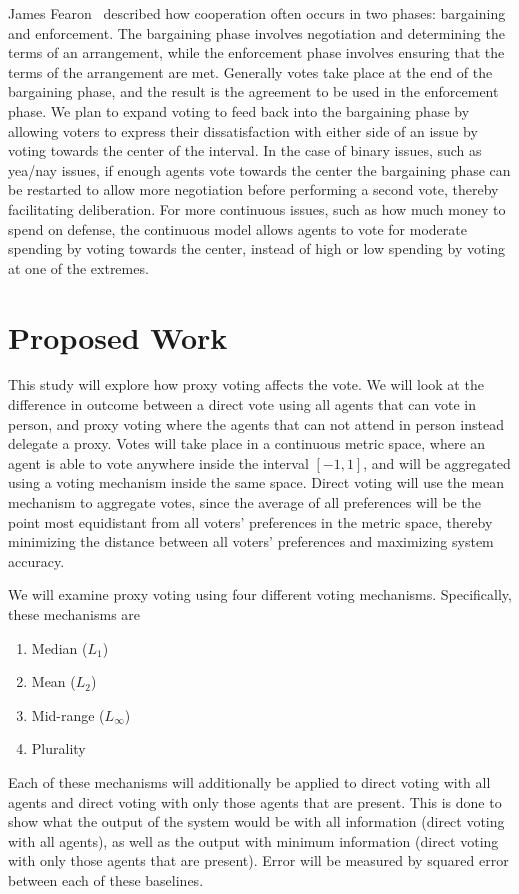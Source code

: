 James Fearon~\cite{Fearon1998} described how cooperation often occurs in two phases:
bargaining and enforcement.
The bargaining phase involves negotiation and determining the terms of an arrangement,
while the enforcement phase involves ensuring that the terms of the arrangement are met.
Generally votes take place at the end of the bargaining phase, and the result is the
agreement to be used in the enforcement phase.
We plan to expand voting to feed back into the bargaining phase by allowing voters to
express their dissatisfaction with either side of an issue by voting towards the
center of the interval.
In the case of binary issues, such as yea/nay issues, if enough agents vote towards the
center the bargaining phase can be restarted to allow more negotiation before
performing a second vote, thereby facilitating deliberation.
For more continuous issues, such as how much money to spend on defense, the
continuous model allows agents to vote for moderate spending by voting towards the
center, instead of high or low spending by voting at one of the extremes.


\section{Proposed Work}\label{sec:contribution}
This study will explore how proxy voting affects the vote.
We will look at the difference in outcome between a direct vote using all agents that
can vote in person, and proxy voting where the agents that can not attend in person
instead delegate a proxy.
Votes will take place in a continuous metric space, where an agent is able to vote
anywhere inside the interval $[-1, 1]$, and will be aggregated using a voting
mechanism inside the same space.
Direct voting will use the mean mechanism to aggregate votes, since the average of
all preferences will be the point most equidistant from all voters' preferences in
the metric space, thereby minimizing the distance between all voters' preferences and
maximizing system accuracy.

We will examine proxy voting using four different voting mechanisms.
Specifically, these mechanisms are
\begin{enumerate}
    \item Median ($L_1$)
    \item Mean ($L_2$)
    \item Mid-range ($L_\infty$)
    \item Plurality
\end{enumerate}
Each of these mechanisms will additionally be applied to direct voting with all
agents and direct voting with only those agents that are present.
This is done to show what the output of the system would be with all information
(direct voting with all agents), as well as the output with minimum information
(direct voting with only those agents that are present).
Error will be measured by squared error between each of these baselines.

